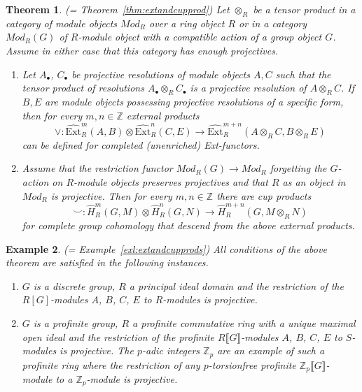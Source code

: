 \documentclass[12pt, a4paper]{article}
\numberwithin{equation}{section}
\newtheorem{thm}{Theorem}[section]
\newtheorem{exl}[thm]{Example}
\theoremstyle{empty}
\theoremstyle{nonumberplain}
\begin{document}
\begin{thm}
(= Theorem~\ref{thm:extandcupprod}) Let $\otimes_R$ be a tensor product in a category of module objects $Mod_R$ over a ring object $R$ or in a category $Mod_R(G)$ of $R$-module object with a compatible action of a group object $G$. Assume in either case that this category has enough projectives.
\begin{enumerate}
    \item Let $A_{\bullet}$, $C_{\bullet}$ be projective resolutions of module objects $A, C$ such that the tensor product of resolutions $A_{\bullet} \otimes_R C_{\bullet}$ is a projective resolution of $A \otimes_R C$. If $B, E$ are module objects possessing projective resolutions of a specific form, then for every $m, n \in \mathbb{Z}$ external products
    \[ \vee: \widehat{\mathrm{Ext}}_R^m(A, B) \otimes \widehat{\mathrm{Ext}}_R^n(C, E) \rightarrow \widehat{\mathrm{Ext}}_R^{m+n}(A  \otimes_R C, B \otimes_R E) \]
    can be defined for completed (unenriched) Ext-functors.
    \item Assume that the restriction functor $Mod_R(G) \rightarrow Mod_R$ forgetting the $G$-action on $R$-module objects preserves projectives and that $R$ as an object in $Mod_R$ is projective. Then for every $m, n \in \mathbb{Z}$ there are cup products
    \[ \smile: \widehat{H}_R^m(G, M) \otimes \widehat{H}_R^n(G, N) \rightarrow \widehat{H}_R^{m+n}(G, M \otimes_R N) \]
    for complete group cohomology that descend from the above external products.
\end{enumerate}
\end{thm}

\begin{exl}
(= Example~\ref{exl:extandcupprods}) All conditions of the above theorem are satisfied in the following instances.
\begin{enumerate}
    \item $G$ is a discrete group, $R$ a principal ideal domain and the restriction of the $R[G]$-modules $A$, $B$, $C$, $E$ to $R$-modules is projective.
    \item $G$ is a profinite group, $R$ a profinite commutative ring with a unique maximal open ideal and the restriction of the profinite $R{\llbracket}G{\rrbracket}$-modules $A$, $B$, $C$, $E$ to $S$-modules is projective. The $p$-adic integers $\mathbb{Z}_p$ are an example of such a profinite ring where the restriction of any $p$-torsionfree profinite $\mathbb{Z}_p{\llbracket}G{\rrbracket}$-module to a $\mathbb{Z}_p$-module is projective.
\end{enumerate}
\end{exl}
\end{document}

